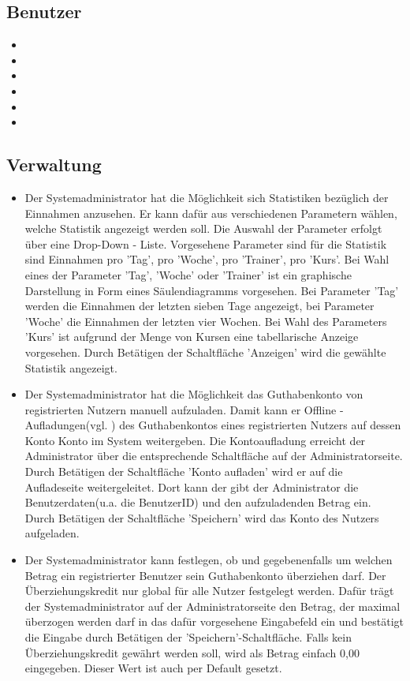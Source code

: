 \documentclass[a4paper]{scrreprt}
\begin{document}
\subsection{Benutzer}
\begin{itemize}
	\item {}
	\item {}
	\item {}
	\item {}
	\item {}
	\item {}
\end{itemize}

\subsection{Verwaltung}
\begin{itemize}
	\item {}
	Der Systemadministrator hat die Möglichkeit sich Statistiken bezüglich der Einnahmen anzusehen. Er kann dafür aus verschiedenen Parametern wählen, welche Statistik angezeigt werden soll. Die Auswahl der Parameter erfolgt über eine Drop-Down - Liste. Vorgesehene Parameter sind für die Statistik sind Einnahmen pro 'Tag', pro 'Woche', pro 'Trainer', pro 'Kurs'. Bei Wahl eines der Parameter 'Tag', 'Woche' oder 'Trainer' ist ein graphische Darstellung in Form eines Säulendiagramms vorgesehen. Bei Parameter 'Tag' werden die Einnahmen der letzten sieben Tage angezeigt, bei Parameter 'Woche' die Einnahmen der letzten vier Wochen. Bei Wahl des Parameters 'Kurs' ist aufgrund der Menge von Kursen eine tabellarische Anzeige vorgesehen. Durch Betätigen der Schaltfläche 'Anzeigen' wird die gewählte Statistik angezeigt.
	\item {}
	Der Systemadministrator hat die Möglichkeit das Guthabenkonto von  registrierten Nutzern manuell aufzuladen. Damit kann er \glqq Offline - Aufladungen\grqq (vgl. ) des Guthabenkontos eines registrierten Nutzers auf dessen Konto Konto im System weitergeben. Die Kontoaufladung erreicht der Administrator über die entsprechende Schaltfläche auf der Administratorseite. Durch Betätigen der Schaltfläche 'Konto aufladen' wird er auf die Aufladeseite weitergeleitet. Dort kann der gibt der Administrator die Benutzerdaten(u.a. die BenutzerID) und den aufzuladenden Betrag ein. Durch Betätigen der Schaltfläche 'Speichern' wird das Konto des Nutzers aufgeladen.
	\item {}
	Der Systemadministrator kann festlegen, ob und gegebenenfalls um welchen Betrag ein registrierter Benutzer sein Guthabenkonto überziehen darf. Der Überziehungskredit nur global für alle Nutzer festgelegt werden. Dafür trägt der Systemadministrator auf der Administratorseite den Betrag, der maximal überzogen werden darf in das dafür vorgesehene Eingabefeld ein und bestätigt die Eingabe durch Betätigen der 'Speichern'-Schaltfläche.
	Falls kein Überziehungskredit gewährt werden soll, wird als Betrag einfach 0,00 eingegeben. Dieser Wert ist auch per Default gesetzt.
\end{itemize}
\end{document}
